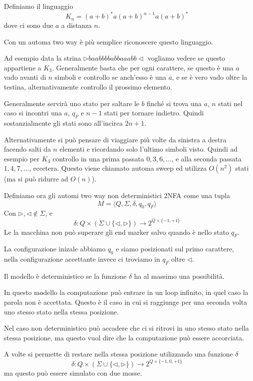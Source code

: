 \documentclass[12pt]{article}
\begin{document}
\begin{tcolorbox}
	Definiamo il linguaggio
	$$ K_n = (a + b)^* a(a + b)^{n - 1} a (a + b)^* $$
	dove ci sono due $a$ a distanza $n$.

	Con un automa two way è più semplice riconoscere questo linguaggio.

	Ad esempio data la strina $\rhd baabbbbabbaaabb \lhd$ vogliamo vedere se questo appartiene a $K_3$.
	Generalmente basta che per ogni carattere, se questo è una $a$ vado avanti di $n$ simboli e controllo se anch'esso è una $a$, e se è vero vado oltre la testina, alternativamente controllo il prossimo elemento.

	Generalmente servirà uno stato per saltare le $b$ finché si trova una $a$, $n$ stati nel caso si incontri una $a$, $q_F$ e $n - 1$ stati per tornare indietro.
	Quindi sostanzialmente gli stati sono all'incirca $2n + 1$.

	Alternativamente si può pensare di viaggiare più volte da sinistra a destra facendo salti da $n$ elementi e ricordando solo l'ultimo simboli visto.
	Quindi ad esempio per $K_3$ controllo in una prima passata $0, 3, 6, \dots$, e alla seconda passata $1, 4, 7, \dots$, eccetera.
	Questo viene chiamato automa sweep ed utilizza $O(n^2)$ stati (ma si può ridurre ad $O(n)$).
\end{tcolorbox}

Definiamo ora gli automi two way non deterministici 2NFA come una tupla
$$ M = \langle Q, \Sigma, \delta, q_0, q_F \rangle $$
Con $\rhd, \lhd \not \in \Sigma$, e 
$$ \delta : Q \times (\Sigma \cup \{\lhd, \rhd\}) \rightarrow 2^{Q \times \{-1 , +1\}} $$
Le la macchina non può superare gli end marker salvo quando è nello stato $q_F$.

La configurazione inizale abbiamo $q_0$ e siamo posizionati sul primo carattere, nella configurazione accettante invece ci troviamo in $q_F$ oltre $\lhd$.

Il modello è deterministico se la funzione $\delta$ ha al massimo una possibilità.

In questo modello la computazione può entrare in un loop infinito, in quel caso la parola non è accettata.
Questo è il caso in cui si raggiunge per una seconda volta uno stesso stato nella stessa posizione.

Nel caso non deterministico può accadere che ci si ritrovi in uno stesso stato nella stessa posizione, ma questo vuol dire che la computazione può essere accorciata.

A volte si permette di restare nella stessa posizione utilizzando una funzione $\delta$
$$ \delta : Q \times (\Sigma \cup \{\lhd, \rhd\}) \rightarrow 2^{Q \times \{-1 , 0, +1\}} $$
ma questo può essere simulato con due mosse.
\end{document}
